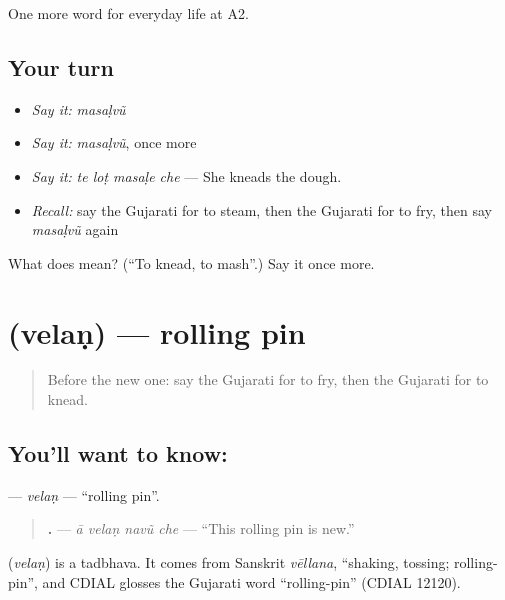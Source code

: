 \begin{grammarlens}[title={What you've built}]
One more word for everyday life at A2.
\end{grammarlens}

\subsection*{Your turn}
\begin{itemize}
\raggedright
  \item \emph{Say it:} \emph{masaḷvũ}
  \item \emph{Say it:} \emph{masaḷvũ}, once more
  \item \emph{Say it:} \emph{te loṭ masaḷe che} — She kneads the dough.
  \item \emph{Recall:} say the Gujarati for to steam, then the Gujarati for to fry, then say \emph{masaḷvũ} again
\end{itemize}

\begin{tcolorbox}[breakable,colback=teal!4,colframe=teal!35!black,title={Before you move on}]
What does  mean? (\textquotedblleft{}To knead, to mash\textquotedblright{}.) Say it once more.
\end{tcolorbox}
\section[\texorpdfstring{\gu{વેલણ} (velaṇ)}{વેલણ (velaṇ)}]{ (velaṇ) — rolling pin}

\label{lesson:GU-C168-velan}



\begin{quote}
Before the new one: say the Gujarati for to fry, then the Gujarati for to knead.
\end{quote}

\subsection*{You'll want to know: }
\textbf{} — \emph{velaṇ} — \textquotedblleft{}rolling pin\textquotedblright{}.

\begin{quote}
\textbf{   .} — \emph{ā velaṇ navũ che} — \textquotedblleft{}This rolling pin is new.\textquotedblright{}
\end{quote}

\begin{cousinweb}
\textbf{} (\emph{velaṇ}) is a tadbhava. It comes from Sanskrit \emph{vēllana}, \textquotedblleft{}shaking, tossing; rolling-pin\textquotedblright{}, and CDIAL glosses the Gujarati word \textquotedblleft{}rolling-pin\textquotedblright{} (CDIAL 12120).
\end{cousinweb}


